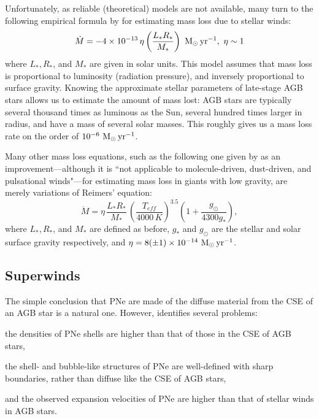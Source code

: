 \documentclass[twocolumn]{aastex63}
\begin{document}
Unfortunately, as reliable (theoretical) models are not available, many turn to the following empirical formula by \cite{reimers} for estimating mass loss due to stellar winds:
\begin{equation*}
    \dot M = -4\times 10^{-13}\,\eta \left(\frac{L_*R_*}{M_*}\right)~{\rm M_\odot\,yr^{-1}},~{\rm \eta \sim 1}
\end{equation*}
where $L_*, R_*$, and $M_*$ are given in solar units. This model assumes that mass loss is proportional to luminosity (radiation pressure), and inversely proportional to surface gravity. Knowing the approximate stellar parameters of late-stage AGB stars allows us to estimate the amount of mass lost: AGB stars are typically several thousand times as luminous as the Sun, several hundred times larger in radius, and have a mass of several solar masses. This roughly gives us a mass loss rate on the order of $10^{-6}~{\rm M_\odot\,yr^{-1}}$.

Many other mass loss equations, such as the following one given by \cite{schroeder} as an improvement—although it is ``not applicable to molecule-driven, dust-driven, and pulsational winds"—for estimating mass loss in giants with low gravity, are merely variations of Reimers' equation:
\begin{equation*}
    \dot M = \eta\,\frac{L_*R_*}{M_*}\,\left(\frac{T_{eff}}{4000\,K}\right)^{3.5}\left(1+\frac{g_\odot}{4300g_*}\right),
\end{equation*}
where $L_*, R_*$, and $M_*$ are defined as before, $g_*$ and $g_\odot$ are the stellar and solar surface gravity respectively, and $\eta = 8 (\pm 1) \times 10^{-14}~{\rm M_\odot\,yr^{-1}}$. 



\subsection{Superwinds} \label{subsec:superwinds}

The simple conclusion that PNe are made of the diffuse material from the CSE of an AGB star is a natural one. However, \cite{kwok2000} identifies several problems: 
\begin{enumerate*}[label=(\roman*)]
    \item the densities of PNe shells are higher than that of those in the CSE of AGB stars,
    \item the shell- and bubble-like structures of PNe are well-defined with sharp boundaries, rather than diffuse like the CSE of AGB stars, 
    \item and the observed expansion velocities of PNe are higher than that of stellar winds in AGB stars. 
\end{enumerate*}
\end{document}
